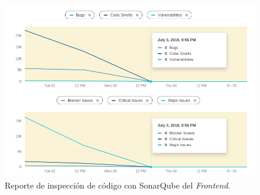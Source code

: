 \begin{figure}[htbp]
    \centering
    \includegraphics[width=\textwidth]{reporteQA_FE2.png}
    \caption{Reporte de inspección de código con SonarQube del \textit{Frontend}.}
    \label{fig:QAfrontend}
\end{figure}


